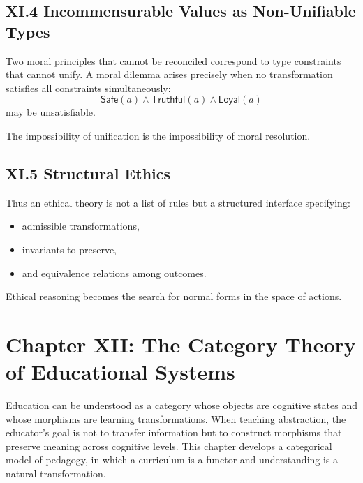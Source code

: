 \documentclass[11pt,letterpaper]{article}
\begin{document}
\subsection{XI.4 Incommensurable Values as Non-Unifiable Types}

Two moral principles that cannot be reconciled correspond to type constraints that cannot unify. A moral dilemma arises precisely when no transformation satisfies all constraints simultaneously:
\[
\mathsf{Safe}(a) \land \mathsf{Truthful}(a) \land \mathsf{Loyal}(a)
\]
may be unsatisfiable.

The impossibility of unification is the impossibility of moral resolution.

\subsection{XI.5 Structural Ethics}

Thus an ethical theory is not a list of rules but a structured interface specifying:
\begin{itemize}
    \item admissible transformations,
    \item invariants to preserve,
    \item and equivalence relations among outcomes.
\end{itemize}

Ethical reasoning becomes the search for normal forms in the space of actions.

\newpage

\section{Chapter XII: The Category Theory of Educational Systems}

Education can be understood as a category whose objects are cognitive states and whose morphisms are learning transformations. When teaching abstraction, the educator’s goal is not to transfer information but to construct morphisms that preserve meaning across cognitive levels. This chapter develops a categorical model of pedagogy, in which a curriculum is a functor and understanding is a natural transformation.
\end{document}
